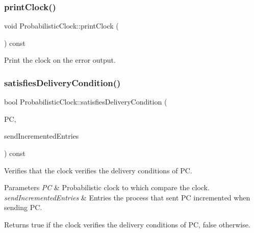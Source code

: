 \mbox{\label{class_probabilistic_clock_a1169d9d5442d55c4dd4e2e730bc2b008}} 
\subsubsection{\texorpdfstring{print\+Clock()}{printClock()}}
{\footnotesize\ttfamily void Probabilistic\+Clock\+::print\+Clock (\begin{DoxyParamCaption}{ }\end{DoxyParamCaption}) const}



Print the clock on the error output. 

\mbox{\label{class_probabilistic_clock_a56bced001a856aa04168d787cc2dd549}} 
\subsubsection{\texorpdfstring{satisfies\+Delivery\+Condition()}{satisfiesDeliveryCondition()}}
{\footnotesize\ttfamily bool Probabilistic\+Clock\+::satisfies\+Delivery\+Condition (\begin{DoxyParamCaption}\item[{const \hyperlink{class_probabilistic_clock}{Probabilistic\+Clock} \&}]{PC,  }\item[{const vector$<$ unsigned int $>$ \&}]{send\+Incremented\+Entries }\end{DoxyParamCaption}) const}



Verifies that the clock verifies the delivery conditions of PC. 


\begin{DoxyParams}{Parameters}
{\em PC} & Probabilistic clock to which compare the clock. \\
\hline
{\em send\+Incremented\+Entries} & Entries the process that sent PC incremented when sending PC. \\
\hline
\end{DoxyParams}
\begin{DoxyReturn}{Returns}
true if the clock verifies the delivery conditions of PC, false otherwise. 
\end{DoxyReturn}
\mbox{\label{class_probabilistic_clock_ad0cdbd2ad50309fae0665df4ee5247ba}} 
